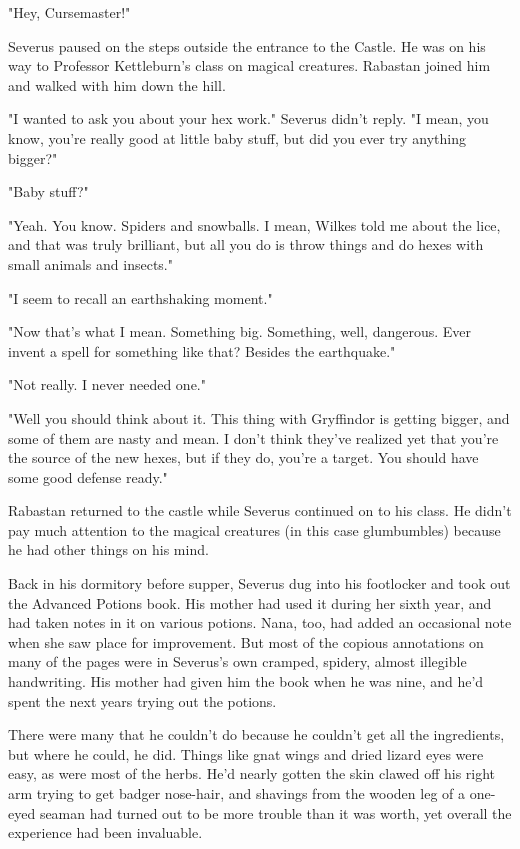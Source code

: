 \documentclass[a4paper,11pt]{article}
\begin{document}
"Hey, Cursemaster!"

Severus paused on the steps outside the entrance to the Castle. He was on his way to Professor Kettleburn's class on magical creatures. Rabastan joined him and walked with him down the hill.

"I wanted to ask you about your hex work." Severus didn't reply. "I mean, you know, you're really good at little baby stuff, but did you ever try anything bigger?"

"Baby stuff?"

"Yeah. You know. Spiders and snowballs. I mean, Wilkes told me about the lice, and that was truly brilliant, but all you do is throw things and do hexes with small animals and insects."

"I seem to recall an earthshaking moment."

"Now that's what I mean. Something big. Something, well, dangerous. Ever invent a spell for something like that? Besides the earthquake."

"Not really. I never needed one."

"Well you should think about it. This thing with Gryffindor is getting bigger, and some of them are nasty and mean. I don't think they've realized yet that you're the source of the new hexes, but if they do, you're a target. You should have some good defense ready."

Rabastan returned to the castle while Severus continued on to his class. He didn't pay much attention to the magical creatures (in this case glumbumbles) because he had other things on his mind.

Back in his dormitory before supper, Severus dug into his footlocker and took out the Advanced Potions book. His mother had used it during her sixth year, and had taken notes in it on various potions. Nana, too, had added an occasional note when she saw place for improvement. But most of the copious annotations on many of the pages were in Severus's own cramped, spidery, almost illegible handwriting. His mother had given him the book when he was nine, and he'd spent the next years trying out the potions.

There were many that he couldn't do because he couldn't get all the ingredients, but where he could, he did. Things like gnat wings and dried lizard eyes were easy, as were most of the herbs. He'd nearly gotten the skin clawed off his right arm trying to get badger nose-hair, and shavings from the wooden leg of a one-eyed seaman had turned out to be more trouble than it was worth, yet overall the experience had been invaluable.
\end{document}
